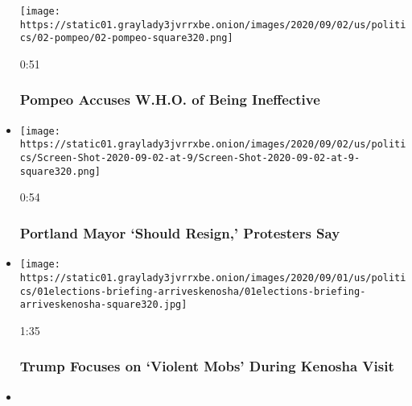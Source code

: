 \begin{itemize}
  \texttt{[image: https://static01.graylady3jvrrxbe.onion/images/2020/09/02/us/politics/02-pompeo/02-pompeo-square320.png]}

  0:51

  \hypertarget{pompeo-accuses-who-of-being-ineffective}{%
  \subsubsection{Pompeo Accuses W.H.O. of Being
  Ineffective}\label{pompeo-accuses-who-of-being-ineffective}}
\item
  \href{https://www.nytimes3xbfgragh.onion/video/us/politics/100000007320667/portland-mayor-resignation.html?action=click\&module=video-series-bar\&region=header\&pgtype=Article\&playlistId=video/us-politics}{}

  \texttt{[image: https://static01.graylady3jvrrxbe.onion/images/2020/09/02/us/politics/Screen-Shot-2020-09-02-at-9/Screen-Shot-2020-09-02-at-9-square320.png]}

  0:54

  \hypertarget{portland-mayor-should-resign-protesters-say}{%
  \subsubsection{Portland Mayor `Should Resign,' Protesters
  Say}\label{portland-mayor-should-resign-protesters-say}}
\item
  \href{https://www.nytimes3xbfgragh.onion/video/us/politics/100000007319114/trump-visits-kenosha-jacob-blake.html?action=click\&module=video-series-bar\&region=header\&pgtype=Article\&playlistId=video/us-politics}{}

  \texttt{[image: https://static01.graylady3jvrrxbe.onion/images/2020/09/01/us/politics/01elections-briefing-arriveskenosha/01elections-briefing-arriveskenosha-square320.jpg]}

  1:35

  \hypertarget{trump-focuses-on-violent-mobs-during-kenosha-visit}{%
  \subsubsection{Trump Focuses on `Violent Mobs' During Kenosha
  Visit}\label{trump-focuses-on-violent-mobs-during-kenosha-visit}}
\item
  \href{https://www.nytimes3xbfgragh.onion/video/us/politics/100000007317812/trump-rittenhouse-teenager-peaceful-protest.html?action=click\&module=video-series-bar\&region=header\&pgtype=Article\&playlistId=video/us-politics}{}


\end{itemize}

